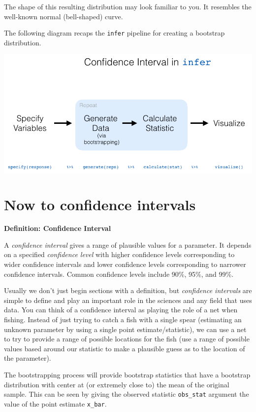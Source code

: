 \documentclass[12pt,]{krantz}
\begin{document}
The shape of this resulting distribution may look familiar to you. It
resembles the well-known normal (bell-shaped) curve.

The following diagram recaps the \texttt{infer} pipeline for creating a
bootstrap distribution.

\begin{center}\includegraphics[width=\textwidth]{images/flowcharts/infer/ci_diagram} \end{center}

\section{Now to confidence intervals}\label{now-to-confidence-intervals}

\textbf{Definition: Confidence Interval}

A \emph{confidence interval} gives a range of plausible values for a
parameter. It depends on a specified \emph{confidence level} with higher
confidence levels corresponding to wider confidence intervals and lower
confidence levels corresponding to narrower confidence intervals. Common
confidence levels include 90\%, 95\%, and 99\%.

Usually we don't just begin sections with a definition, but
\emph{confidence intervals} are simple to define and play an important
role in the sciences and any field that uses data. You can think of a
confidence interval as playing the role of a net when fishing. Instead
of just trying to catch a fish with a single spear (estimating an
unknown parameter by using a single point estimate/statistic), we can
use a net to try to provide a range of possible locations for the fish
(use a range of possible values based around our statistic to make a
plausible guess as to the location of the parameter).

The bootstrapping process will provide bootstrap statistics that have a
bootstrap distribution with center at (or extremely close to) the mean
of the original sample. This can be seen by giving the observed
statistic \texttt{obs\_stat} argument the value of the point estimate
\texttt{x\_bar}.
\end{document}
